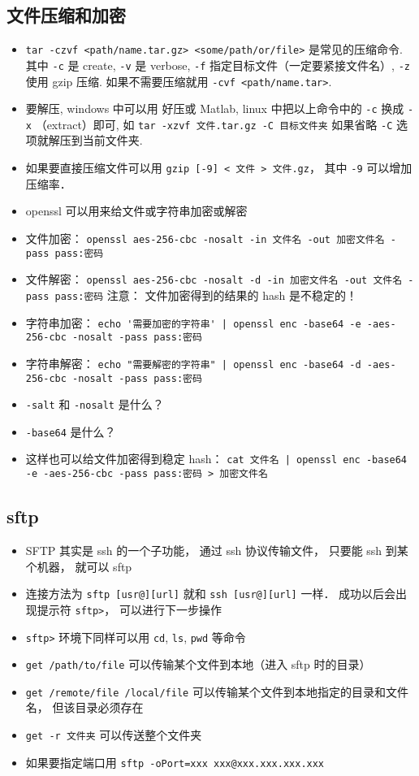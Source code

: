 \subsection{文件压缩和加密}
\begin{itemize}
\item \verb`tar -czvf <path/name.tar.gz> <some/path/or/file>` 是常见的压缩命令. 其中 \verb`-c` 是 create, \verb`-v` 是 verbose, \verb`-f` 指定目标文件（一定要紧接文件名）, \verb`-z` 使用 gzip 压缩. 如果不需要压缩就用 \verb`-cvf <path/name.tar>`.
\item 要解压, windows 中可以用 好压或 Matlab, linux 中把以上命令中的 \verb`-c` 换成 \verb`-x` （extract）即可, 如 \verb`tar -xzvf 文件.tar.gz -C 目标文件夹` 如果省略 \verb`-C` 选项就解压到当前文件夹.
\item 如果要直接压缩文件可以用 \verb|gzip [-9] < 文件 > 文件.gz|， 其中 \verb|-9| 可以增加压缩率．
\item openssl 可以用来给文件或字符串加密或解密
\item 文件加密： \verb`openssl aes-256-cbc -nosalt -in 文件名 -out 加密文件名 -pass pass:密码`
\item 文件解密： \verb`openssl aes-256-cbc -nosalt -d -in 加密文件名 -out 文件名 -pass pass:密码`
注意： 文件加密得到的结果的 hash 是不稳定的！
\item 字符串加密： \verb`echo '需要加密的字符串' | openssl enc -base64 -e -aes-256-cbc -nosalt -pass pass:密码`
\item 字符串解密： \verb`echo "需要解密的字符串" | openssl enc -base64 -d -aes-256-cbc -nosalt -pass pass:密码`
\item \verb`-salt` 和 \verb`-nosalt` 是什么？
\item \verb`-base64` 是什么？
\item 这样也可以给文件加密得到稳定 hash： \verb`cat 文件名 | openssl enc -base64 -e -aes-256-cbc -pass pass:密码 > 加密文件名`
\end{itemize}

\subsection{sftp}
\begin{itemize}
\item SFTP 其实是 ssh 的一个子功能， 通过 ssh 协议传输文件， 只要能 ssh 到某个机器， 就可以 sftp
\item 连接方法为 \verb`sftp [usr@][url]` 就和 \verb`ssh [usr@][url]` 一样． 成功以后会出现提示符 \verb`sftp>`， 可以进行下一步操作
\item \verb`sftp>` 环境下同样可以用 \verb`cd`, \verb`ls`, \verb`pwd` 等命令
\item \verb`get /path/to/file` 可以传输某个文件到本地（进入 sftp 时的目录）
\item \verb`get /remote/file /local/file` 可以传输某个文件到本地指定的目录和文件名， 但该目录必须存在
\item \verb`get -r 文件夹` 可以传送整个文件夹
\item 如果要指定端口用 \verb`sftp -oPort=xxx xxx@xxx.xxx.xxx.xxx`
\end{itemize}

